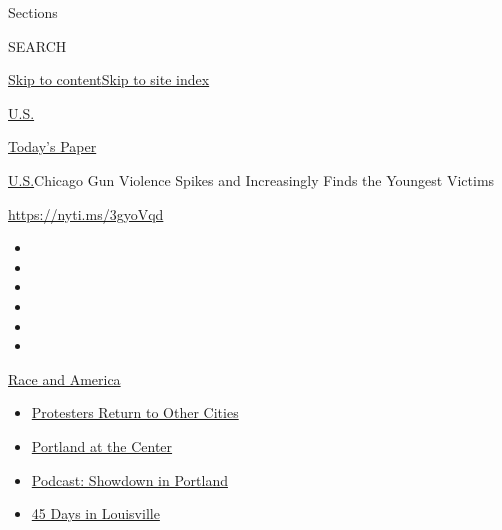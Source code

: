 Sections

SEARCH

\protect\hyperlink{site-content}{Skip to
content}\protect\hyperlink{site-index}{Skip to site index}

\href{https://www.nytimes3xbfgragh.onion/section/us}{U.S.}

\href{https://myaccount.nytimes3xbfgragh.onion/auth/login?response_type=cookie\&client_id=vi}{}

\href{https://www.nytimes3xbfgragh.onion/section/todayspaper}{Today's
Paper}

\href{/section/us}{U.S.}\textbar{}Chicago Gun Violence Spikes and
Increasingly Finds the Youngest Victims

\url{https://nyti.ms/3gyoVqd}

\begin{itemize}
\item
\item
\item
\item
\item
\item
\end{itemize}

\href{https://www.nytimes3xbfgragh.onion/news-event/george-floyd-protests-minneapolis-new-york-los-angeles?action=click\&pgtype=Article\&state=default\&region=TOP_BANNER\&context=storylines_menu}{Race
and America}

\begin{itemize}
\tightlist
\item
  \href{https://www.nytimes3xbfgragh.onion/2020/07/26/us/protests-portland-seattle-trump.html?action=click\&pgtype=Article\&state=default\&region=TOP_BANNER\&context=storylines_menu}{Protesters
  Return to Other Cities}
\item
  \href{https://www.nytimes3xbfgragh.onion/2020/07/24/us/portland-oregon-protests-white-race.html?action=click\&pgtype=Article\&state=default\&region=TOP_BANNER\&context=storylines_menu}{Portland
  at the Center}
\item
  \href{https://www.nytimes3xbfgragh.onion/2020/07/23/podcasts/the-daily/portland-protests.html?action=click\&pgtype=Article\&state=default\&region=TOP_BANNER\&context=storylines_menu}{Podcast:
  Showdown in Portland}
\item
  \href{https://www.nytimes3xbfgragh.onion/interactive/2020/07/16/us/black-lives-matter-protests-louisville-breonna-taylor.html?action=click\&pgtype=Article\&state=default\&region=TOP_BANNER\&context=storylines_menu}{45
  Days in Louisville}
\end{itemize}

